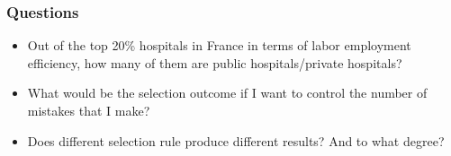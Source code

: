 \documentclass[10pt,mathserif,]{beamer}
\begin{document}
\begin{frame}
  \frametitle{Questions}
  \begin{itemize}\itemsep=12pt
    \item Out of the top 20\% hospitals in France in terms of labor employment
          efficiency, how many of them are public hospitals/private hospitals?
    \item What would be the selection outcome if I want to control the number of mistakes
          that I make?
    \item Does different selection rule produce different results? And to what degree?
  \end{itemize}
\end{frame}




\end{document}
